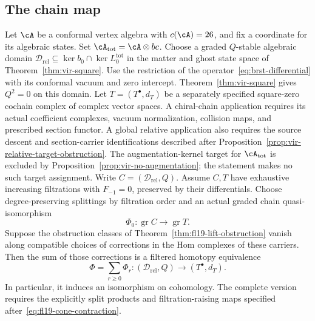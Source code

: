 \subsection{The chain map}

\begin{theorem}
\label{thm:brst-bar-genus0}
Let $\cA$ be a conformal vertex algebra with $c(\cA)=26$, and fix a coordinate for its algebraic states. Set $\cA_{\mathrm{tot}}=\cA\otimes bc$.
Choose a graded $Q$-stable algebraic domain
$\mathcal D_{\mathrm{rel}}\subseteq\ker b_0\cap\ker L_0^{\mathrm{tot}}$
in the matter and ghost state space of Theorem~\ref{thm:vir-square}.
Use the restriction of the operator~\eqref{eq:brst-differential} with its conformal vacuum and zero intercept.
Theorem~\ref{thm:vir-square} gives $Q^2=0$ on this domain.
Let $T=(T^\bullet,d_T)$ be a separately specified square-zero cochain complex of complex vector spaces.
A chiral-chain application requires its actual coefficient complexes, vacuum normalization, collision maps, and prescribed section functor.
A global relative application also requires the source descent and section-carrier identifications described after Proposition~\ref{prop:vir-relative-target-obstruction}.
The augmentation-kernel target for $\cA_{\mathrm{tot}}$ is excluded by Proposition~\ref{prop:vir-no-augmentation}; the statement makes no such target assignment.
Write $C=(\mathcal D_{\mathrm{rel}},Q)$.
Assume $C,T$ have exhaustive increasing filtrations with $F_{-1}=0$, preserved by their differentials.
Choose degree-preserving splittings by filtration order and an actual graded chain quasi-isomorphism
\begin{equation}\label{eq:arkhipov-classical}
\Phi_0:\operatorname{gr}C\longrightarrow\operatorname{gr}T.
\end{equation}
Suppose the obstruction classes of Theorem~\ref{thm:fl19-lift-obstruction} vanish along compatible choices of corrections in the Hom complexes of these carriers.
Then the sum of those corrections is a filtered homotopy equivalence
\[
\Phi=\sum_{r\ge0}\Phi_r:
(\mathcal D_{\mathrm{rel}},Q)\longrightarrow
(T^\bullet,d_T).
\]
In particular, it induces an isomorphism on cohomology.
The complete version requires the explicitly split products and filtration-raising maps specified after~\eqref{eq:fl19-cone-contraction}.
\end{theorem}

